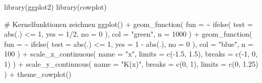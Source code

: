 \documentclass[
  a4paper,
  DIV=11,
  oneside]{scrreprt}
\newenvironment{Shaded}{\begin{snugshade}}{\end{snugshade}}
\newcommand{\AttributeTok}[1]{\textcolor[rgb]{0.40,0.45,0.13}{#1}}
\newcommand{\CommentTok}[1]{\textcolor[rgb]{0.37,0.37,0.37}{#1}}
\newcommand{\DecValTok}[1]{\textcolor[rgb]{0.68,0.00,0.00}{#1}}
\newcommand{\FloatTok}[1]{\textcolor[rgb]{0.68,0.00,0.00}{#1}}
\newcommand{\FunctionTok}[1]{\textcolor[rgb]{0.28,0.35,0.67}{#1}}
\newcommand{\NormalTok}[1]{\textcolor[rgb]{0.00,0.23,0.31}{#1}}
\newcommand{\SpecialCharTok}[1]{\textcolor[rgb]{0.37,0.37,0.37}{#1}}
\newcommand{\StringTok}[1]{\textcolor[rgb]{0.13,0.47,0.30}{#1}}
\begin{document}
\begin{Shaded}
\begin{Highlighting}[]
\FunctionTok{library}\NormalTok{(ggplot2)}
\FunctionTok{library}\NormalTok{(cowplot)}

\CommentTok{\# Kernelfunktionen zeichnen}
\FunctionTok{ggplot}\NormalTok{() }\SpecialCharTok{+} 
    \FunctionTok{geom\_function}\NormalTok{(}
      \AttributeTok{fun =} \SpecialCharTok{\textasciitilde{}} \FunctionTok{ifelse}\NormalTok{(}
        \AttributeTok{test =} \FunctionTok{abs}\NormalTok{(.) }\SpecialCharTok{\textless{}=} \DecValTok{1}\NormalTok{,}
        \AttributeTok{yes =}  \DecValTok{1}\SpecialCharTok{/}\DecValTok{2}\NormalTok{, }
        \AttributeTok{no =} \DecValTok{0}
\NormalTok{      ), }
      \AttributeTok{col =} \StringTok{"green"}\NormalTok{, }
      \AttributeTok{n =} \DecValTok{1000}
\NormalTok{      ) }\SpecialCharTok{+} 
    \FunctionTok{geom\_function}\NormalTok{(}
      \AttributeTok{fun =} \SpecialCharTok{\textasciitilde{}} \FunctionTok{ifelse}\NormalTok{(}
        \AttributeTok{test =} \FunctionTok{abs}\NormalTok{(.) }\SpecialCharTok{\textless{}=} \DecValTok{1}\NormalTok{, }
        \AttributeTok{yes =} \DecValTok{1} \SpecialCharTok{{-}} \FunctionTok{abs}\NormalTok{(.), }
        \AttributeTok{no =} \DecValTok{0}
\NormalTok{      ), }
      \AttributeTok{col =} \StringTok{"blue"}\NormalTok{, }
      \AttributeTok{n =} \DecValTok{100}
\NormalTok{      ) }\SpecialCharTok{+} 
    \FunctionTok{scale\_x\_continuous}\NormalTok{(}
      \AttributeTok{name =} \StringTok{"x"}\NormalTok{, }
      \AttributeTok{limits =} \FunctionTok{c}\NormalTok{(}\SpecialCharTok{{-}}\FloatTok{1.5}\NormalTok{, }\FloatTok{1.5}\NormalTok{), }
      \AttributeTok{breaks =} \FunctionTok{c}\NormalTok{(}\SpecialCharTok{{-}}\DecValTok{1}\NormalTok{, }\DecValTok{0}\NormalTok{, }\DecValTok{1}\NormalTok{)}
\NormalTok{    ) }\SpecialCharTok{+}
    \FunctionTok{scale\_y\_continuous}\NormalTok{(}
      \AttributeTok{name =} \StringTok{"K(x)"}\NormalTok{, }
      \AttributeTok{breaks =} \FunctionTok{c}\NormalTok{(}\DecValTok{0}\NormalTok{, }\DecValTok{1}\NormalTok{), }
      \AttributeTok{limits =} \FunctionTok{c}\NormalTok{(}\DecValTok{0}\NormalTok{, }\FloatTok{1.25}\NormalTok{)}
\NormalTok{    ) }\SpecialCharTok{+}
    \FunctionTok{theme\_cowplot}\NormalTok{()}
\end{Highlighting}
\end{Shaded}
\end{document}
